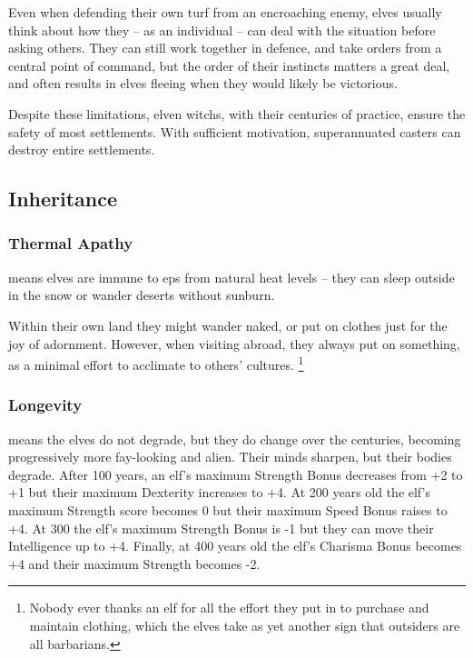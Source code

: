 \begin{multicols}{2}
Even when defending their own turf from an encroaching enemy, elves usually think about how they -- as an individual -- can deal with the situation before asking others.
They can still work together in defence, and take orders from a central point of command, but the order of their instincts matters a great deal, and often results in elves fleeing when they would likely be victorious.

Despite these limitations, elven \glspl{witch}, with their centuries of practice, ensure the safety of most settlements.
With sufficient motivation, superannuated casters can destroy entire settlements.

\subsection{Inheritance}

\subsubsection[Thermal Apathy: take no penalties from natural weather.]{Thermal Apathy}
\label{elvenInheritance}
means elves are immune to \glspl{ep} from natural heat levels -- they can sleep outside in the snow or wander deserts without sunburn.

Within their own land they might wander naked, or put on clothes just for the joy of adornment.
However, when visiting abroad, they always put on something, as a minimal effort to acclimate to others' cultures.%
\footnote{Nobody ever thanks an elf for all the effort they put in to purchase and maintain clothing, which the elves take as yet another sign that outsiders are all barbarians.}

\subsubsection{Longevity}
means the elves do not degrade, but they do change over the centuries, becoming progressively more fay-looking and alien.
Their minds sharpen, but their bodies degrade.
After 100 years, an elf's maximum Strength Bonus decreases from +2 to +1 but their maximum Dexterity increases to +4.
At 200 years old the elf's maximum Strength score becomes 0 but their maximum Speed Bonus raises to +4.
At 300 the elf's maximum Strength Bonus is -1 but they can move their Intelligence up to +4.
Finally, at 400 years old the elf's Charisma Bonus becomes +4 and their maximum Strength becomes -2.

  \begin{boxtable}[XcX]


\end{boxtable}
\end{multicols}

